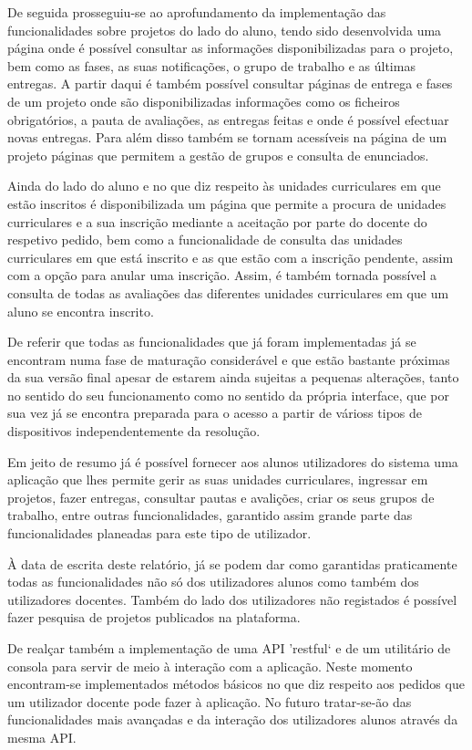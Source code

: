 De seguida prosseguiu-se ao aprofundamento da implementação das funcionalidades sobre projetos do lado do aluno, tendo sido desenvolvida uma página onde é possível consultar as informações disponibilizadas para o projeto, bem como as fases, as suas notificações, o grupo de trabalho e as últimas entregas.
A partir daqui é também possível consultar páginas de entrega e fases de um projeto onde são disponibilizadas informações como os ficheiros obrigatórios, a pauta de avaliações, as entregas feitas e onde é possível efectuar novas entregas.
Para além disso também se tornam acessíveis na página de um projeto páginas que permitem a gestão de grupos e consulta de enunciados.

Ainda do lado do aluno e no que diz respeito às unidades curriculares em que estão inscritos é disponibilizada um página que permite a procura de unidades curriculares e a sua inscrição mediante a aceitação por parte do docente do respetivo pedido, bem como a funcionalidade de consulta das unidades curriculares em que está inscrito e as que estão com a inscrição pendente, assim com a opção para anular uma inscrição.
Assim, é também tornada possível a consulta de todas as avaliações das diferentes unidades curriculares em que um aluno se encontra inscrito.

De referir que todas as funcionalidades que já foram implementadas já se encontram numa fase de maturação considerável e que estão bastante próximas da sua versão final apesar de estarem ainda sujeitas a pequenas alterações, tanto no sentido do seu funcionamento como no sentido da própria interface, que por sua vez já se encontra preparada para o acesso a partir de várioss tipos de dispositivos independentemente da resolução.

Em jeito de resumo já é possível fornecer aos alunos utilizadores do sistema uma aplicação que lhes permite gerir as suas unidades curriculares, ingressar em projetos, fazer entregas, consultar pautas e avalições, criar os seus grupos de trabalho, entre outras funcionalidades, garantido assim grande parte das funcionalidades planeadas para este tipo de utilizador.

À data de escrita deste relatório, já se podem dar como garantidas praticamente todas as funcionalidades não só dos utilizadores alunos como também dos utilizadores docentes. Também do lado dos utilizadores não registados é possível fazer pesquisa de projetos publicados na plataforma.

De realçar também a implementação de uma API 'restful` e de um utilitário de consola para servir de meio à interação com a aplicação. Neste momento encontram-se implementados métodos básicos no que diz respeito aos pedidos que um utilizador docente pode fazer à aplicação. No futuro tratar-se-ão das funcionalidades mais avançadas e da interação dos utilizadores alunos através da mesma API.

\newpage
